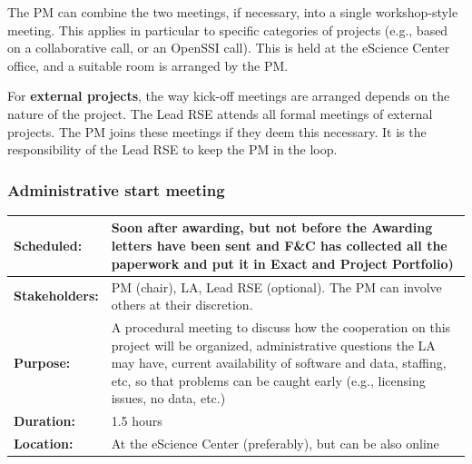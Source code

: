 \documentclass[11pt]{article}
\begin{document}
The PM can combine the two meetings, if necessary, into a single workshop-style meeting. This applies in particular to
specific categories of projects (e.g., based on a collaborative call, or an OpenSSI call). This is held at the eScience
Center office, and a suitable room is arranged by the PM.

For \textbf{external projects}, the way kick-off meetings are arranged depends on the nature of the project. The Lead
RSE attends all formal meetings of external projects. The PM joins these meetings if they deem this necessary. It is
the responsibility of the Lead RSE to keep the PM in the loop.

\subsubsection{Administrative start meeting}

\begin{flushleft}
\tablefirsthead{}
\tablehead{}
\tabletail{}
\tablelasttail{}
\begin{supertabular}{|m{1.0670599in}|m{5.27476in}|}
\hline
\bfseries Scheduled: &
Soon after awarding, but not before the Awarding letters have been sent and F\&C has collected
all the paperwork and put it in Exact and Project Portfolio)\\\hline
\bfseries Stakeholders: &
PM (chair), LA, Lead RSE (optional). The PM can involve others at their discretion. \\\hline
\bfseries Purpose: &
A procedural meeting to discuss how the cooperation on this project will be organized,
administrative questions the LA may have, current availability of software and data, staffing, etc, so that problems
can be caught early (e.g., licensing issues, no data, etc.)\\\hline
\bfseries Duration: &
1.5 hours\\\hline
\bfseries Location: &
At the eScience Center (preferably), but can be also online\\\hline
\end{supertabular}
\end{flushleft}



\end{document}
